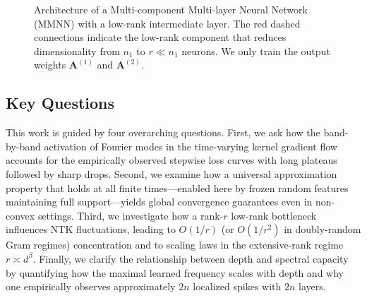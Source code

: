 \documentclass{article}
\begin{document}
\begin{figure}[htbp]
    \caption{Architecture of a Multi-component Multi-layer Neural Network (MMNN) with a low-rank intermediate layer. The red dashed connections indicate the low-rank component that reduces dimensionality from $n_1$ to $r \ll n_1$ neurons.
    We only train the output weights $\bm{A}^{(1)}$ and $\bm{A}^{(2)}$.}
    \label{fig:mmnn_architecture}
\end{figure}

\subsection*{Key Questions}
This work is guided by four overarching questions. First, we ask how the band-by-band activation of Fourier modes in the time-varying kernel gradient flow accounts for the empirically observed stepwise loss curves with long plateaus followed by sharp drops. Second, we examine how a universal approximation property that holds at all finite times—enabled here by frozen random features maintaining full support—yields global convergence guarantees even in non-convex settings. Third, we investigate how a rank-\( r \) low-rank bottleneck influences NTK fluctuations, leading to \( O(1/r) \) (or \( O(1/r^2) \) in doubly-random Gram regimes) concentration and to scaling laws in the extensive-rank regime \( r \asymp d^\beta \). Finally, we clarify the relationship between depth and spectral capacity by quantifying how the maximal learned frequency scales with depth and why one empirically observes approximately \( 2n \) localized spikes with \( 2n \) layers.
\end{document}

